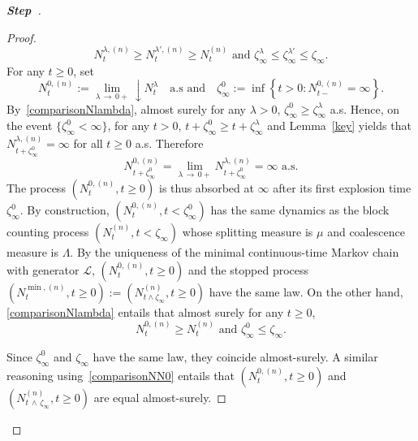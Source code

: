 \documentclass[10pt]{amsart}
\theoremstyle{definition}\newtheorem{defi}[theo]{Definition}\newtheorem{rema}[theo]{Remark}\newtheorem{exam}[theo]{Example}\newtheorem{exem}[theo]{Example}\newtheorem{nota}[theo]{Notation}
\newcommand{\clL}{\mathcal{L}}
\newcounter{stepcount}
\newenvironment{step}{\refstepcounter{stepcount}\begin{proof}[\textbf{Step~\thestepcount}]}{\end{proof}}
\begin{document}
\begin{step}
\begin{proof}
\begin{equation}\label{comparisonNlambda}
N^{\lambda,(n)}_t\geq N_t^{\lambda',(n)}\geq N_t^{(n)}
\text{ and } \zeta_{\infty}^{\lambda}\leq \zeta_{\infty}^{\lambda'}\leq \zeta_{\infty}.
\end{equation}
For any $t\geq 0$, set 
\[
N_t^{0,(n)}:=\underset{\lambda\,\rightarrow\,0+}{\lim}\downarrow N_t^{\lambda}\quad\text{a.s and}\quad\zeta^0_{\infty}:=\inf\left\{t>0: N_{t-}^{0,(n)}=\infty\right\}.
\]
By~\eqref{comparisonNlambda}, almost surely for any $\lambda>0$, $\zeta^{0}_{\infty}\geq \zeta_{\infty}^{\lambda}$ a.s. Hence, on the event $\{\zeta_{\infty}^{0}<\infty\}$, for any $t>0$, $t+\zeta_{\infty}^{0}\geq t+\zeta_{\infty}^{\lambda}$ and Lemma~\ref{key} yields that $N^{\lambda,(n)}_{t+\zeta_{\infty}^{0}}=\infty$ for all $t\geq 0$ a.s. Therefore
\[
N^{0,(n)}_{t+\zeta_{\infty}^{0}}=\underset{\lambda \,\rightarrow\,0+}{\lim} N^{\lambda,(n)}_{t+\zeta_{\infty}^{0}}=\infty \text{ a.s.}
\]
The process $(N_t^{0,(n)},t\geq 0)$ is thus absorbed at $\infty$ after its first explosion time $\zeta_\infty^0$. By construction, $(N_t^{0,(n)},t<\zeta^{0}_{\infty})$ has the same dynamics as the block counting process $(N_t^{(n)},t<\zeta_{\infty})$ whose splitting measure is $\mu$ and coalescence measure is $\Lambda$. By the uniqueness of the minimal continuous-time Markov chain with generator $\clL$, $(N_t^{0,(n)},t\geq 0)$ and the stopped process $(N_t^{\min,(n)},t\geq 0):=(N_{t\wedge \zeta_{\infty}}^{(n)},t\geq 0)$ have the same law. On the other hand, \eqref{comparisonNlambda} entails that almost surely for any $t\geq 0$,
\begin{equation}\label{comparisonNN0}
N_t^{0,(n)}\geq N_t^{(n)} \text{ and } \zeta_{\infty}^0\leq \zeta_{\infty}.
\end{equation}
\pagebreak

\noindent Since $\zeta_{\infty}^0$ and $\zeta_{\infty}$ have the same law, they coincide almost-surely. A similar reasoning using~\eqref{comparisonNN0} entails that $(N_t^{0,(n)},t\geq 0)$ and $(N^{(n)}_{t\,\wedge\,\zeta_\infty},t\geq 0)$ are equal almost-surely.
\end{proof}\let\qed\relax
\end{step}
\vspace*{4pt}
\end{document}
